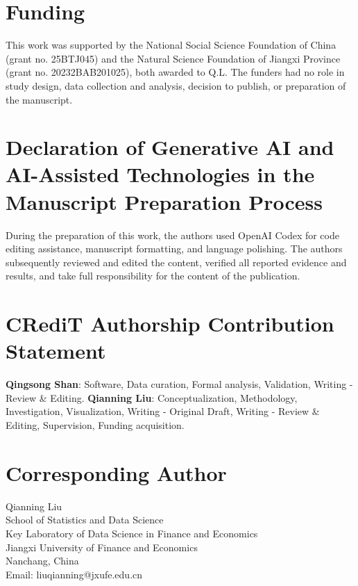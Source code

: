 \documentclass[
  number,
  preprint]{elsarticle}
\begin{document}
\section*{Funding}\label{funding}

This work was supported by the National Social Science Foundation of
China (grant no. 25BTJ045) and the Natural Science Foundation of Jiangxi
Province (grant no. 20232BAB201025), both awarded to Q.L. The funders
had no role in study design, data collection and analysis, decision to
publish, or preparation of the manuscript.

\section*{Declaration of Generative AI and AI-Assisted Technologies in
the Manuscript Preparation
Process}\label{declaration-of-generative-ai-and-ai-assisted-technologies-in-the-manuscript-preparation-process}

During the preparation of this work, the authors used OpenAI Codex for
code editing assistance, manuscript formatting, and language polishing.
The authors subsequently reviewed and edited the content, verified all
reported evidence and results, and take full responsibility for the
content of the publication.

\section*{CRediT Authorship Contribution
Statement}\label{credit-authorship-contribution-statement}

\textbf{Qingsong Shan}: Software, Data curation, Formal analysis,
Validation, Writing - Review \& Editing. \textbf{Qianning Liu}:
Conceptualization, Methodology, Investigation, Visualization, Writing -
Original Draft, Writing - Review \& Editing, Supervision, Funding
acquisition.

\section*{Corresponding Author}\label{corresponding-author}

Qianning Liu\\
School of Statistics and Data Science\\
Key Laboratory of Data Science in Finance and Economics\\
Jiangxi University of Finance and Economics\\
Nanchang, China\\
Email: liuqianning@jxufe.edu.cn



\end{document}
